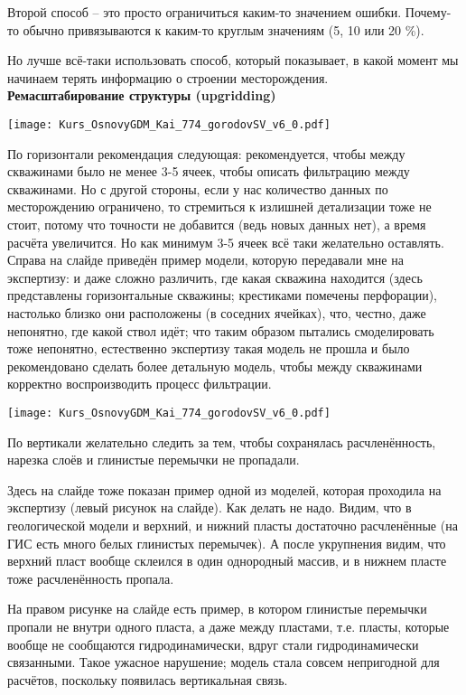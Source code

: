 Второй способ -- это просто ограничиться каким-то значением ошибки. Почему-то обычно привязываются к каким-то круглым значениям (5, 10 или 20 \%).

Но лучше всё-таки использовать способ, который показывает, в какой момент мы начинаем терять информацию о строении месторождения.
\\

\textbf{Ремасштабирование структуры (upgridding)}

\texttt{[image: Kurs\_OsnovyGDM\_Kai\_774\_gorodovSV\_v6\_0.pdf]}

По горизонтали рекомендация следующая: рекомендуется, чтобы между скважинами было не менее 3-5 ячеек, чтобы описать фильтрацию между скважинами.
Но с другой стороны, если у нас количество данных по месторождению ограничено, то стремиться к излишней детализации тоже не стоит, потому что точности не добавится (ведь новых данных нет), а время расчёта увеличится.
Но как минимум 3-5 ячеек всё таки желательно оставлять.
Справа на слайде приведён пример модели, которую передавали мне на экспертизу: и даже сложно различить, где какая скважина находится (здесь представлены горизонтальные скважины; крестиками помечены перфорации), настолько близко они расположены (в соседних ячейках), что, честно, даже непонятно, где какой ствол идёт; что таким образом пытались смоделировать тоже непонятно, естественно экспертизу такая модель не прошла и было рекомендовано сделать более детальную модель, чтобы между скважинами корректно воспроизводить процесс фильтрации.

\texttt{[image: Kurs\_OsnovyGDM\_Kai\_774\_gorodovSV\_v6\_0.pdf]}

По вертикали желательно следить за тем, чтобы сохранялась расчленённость, нарезка слоёв и глинистые перемычки не пропадали.

Здесь на слайде тоже показан пример одной из моделей, которая проходила на экспертизу (левый рисунок на слайде).
Как делать не надо.
Видим, что в геологической модели и верхний, и нижний пласты достаточно расчленённые (на ГИС есть много белых глинистых перемычек).
А после укрупнения видим, что верхний пласт вообще склеился в один однородный массив, и в нижнем пласте тоже расчленённость пропала.

На правом рисунке на слайде есть пример, в котором глинистые перемычки пропали не внутри одного пласта, а даже между пластами, т.е. пласты, которые вообще не сообщаются гидродинамически, вдруг стали гидродинамически связанными.
Такое ужасное нарушение; модель стала совсем непригодной для расчётов, поскольку появилась вертикальная связь.
\\

